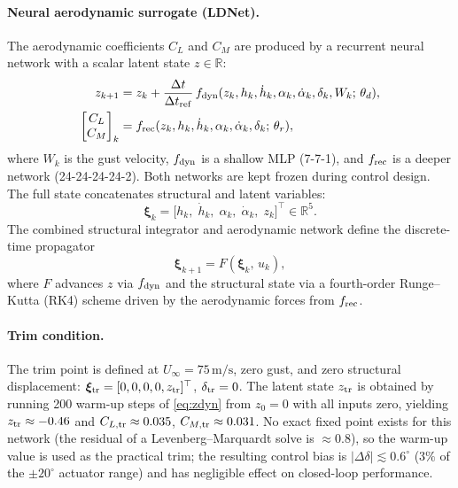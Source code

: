 \documentclass[11pt,a4paper]{article}
\newcommand{\vxi}{\bm{\xi}}
\begin{document}
\paragraph{Neural aerodynamic surrogate (LDNet).}
The aerodynamic coefficients $C_L$ and $C_M$ are produced by a recurrent
neural network with a scalar latent state $z \in \mathbb{R}$:
\begin{align}
  z_{k+1} &= z_k + \frac{\Delta t}{\Delta t_{\rm ref}}\,
             f_{\rm dyn}(z_k, h_k, \dot{h}_k, \alpha_k, \dot{\alpha}_k,
                         \delta_k, W_k;\,\theta_d),
  \label{eq:zdyn}\\
  \begin{bmatrix} C_L \\ C_M \end{bmatrix}_k
             &= f_{\rm rec}(z_k, h_k, \dot{h}_k, \alpha_k, \dot{\alpha}_k,
                            \delta_k;\,\theta_r),
  \label{eq:yrec}
\end{align}
where $W_k$ is the gust velocity, $f_{\rm dyn}$ is a shallow MLP (7-7-1), and
$f_{\rm rec}$ is a deeper network (24-24-24-24-2).
Both networks are kept frozen during control design.
The full state concatenates structural and latent variables:
\begin{equation}
  \vxi_k = \bigl[h_k,\;\dot{h}_k,\;\alpha_k,\;\dot{\alpha}_k,\;z_k\bigr]^\top
  \in \mathbb{R}^5.
\end{equation}
The combined structural integrator and aerodynamic network define the
discrete-time propagator
\begin{equation}
  \vxi_{k+1} = F(\vxi_k,\, u_k),
  \label{eq:propagator}
\end{equation}
where $F$ advances $z$ via $f_{\rm dyn}$ and the structural state via a
fourth-order Runge--Kutta (RK4) scheme driven by the aerodynamic forces from
$f_{\rm rec}$.

\paragraph{Trim condition.}
The trim point is defined at $U_\infty = 75\,\text{m/s}$, zero gust, and zero
structural displacement: $\vxi_{\rm tr} = [0,0,0,0,z_{\rm tr}]^\top$,
$\delta_{\rm tr} = 0$.
The latent state $z_{\rm tr}$ is obtained by running 200 warm-up steps of
\eqref{eq:zdyn} from $z_0 = 0$ with all inputs zero, yielding
$z_{\rm tr} \approx -0.46$ and $C_{L,\rm tr} \approx 0.035$,
$C_{M,\rm tr} \approx 0.031$.
No exact fixed point exists for this network (the residual of a
Levenberg--Marquardt solve is $\approx 0.8$), so the warm-up value is used as
the practical trim; the resulting control bias is $|\Delta\delta| \lesssim 0.6^\circ$
($3\%$ of the $\pm20^\circ$ actuator range) and has negligible effect on
closed-loop performance.
\end{document}
